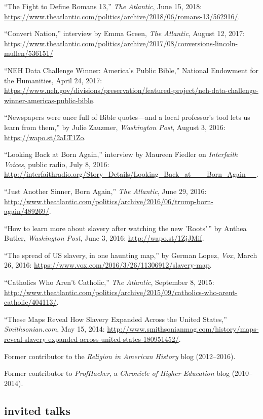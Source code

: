 \documentclass[11pt]{article}
\begin{document}
``The Fight to Define Romans 13,'' \emph{The Atlantic}, June 15, 2018: \url{https://www.theatlantic.com/politics/archive/2018/06/romans-13/562916/}.

``Convert Nation,'' interview by Emma Green, \emph{The Atlantic}, August 12, 
2017: \url{https://www.theatlantic.com/politics/archive/2017/08/conversions-lincoln-mullen/536151/}

``NEH Data Challenge Winner: America's Public Bible,'' National Endowment for 
the Humanities, April 24, 2017: 
\url{https://www.neh.gov/divisions/preservation/featured-project/neh-data-challenge-winner-americas-public-bible}.

``Newspapers were once full of Bible quotes---and a local professor's tool lets 
us learn from them,'' by Julie Zauzmer, \emph{Washington Post}, August 3, 2016: 
\url{https://wapo.st/2aLT1Zo}.

``Looking Back at Born Again,'' interview by Maureen Fiedler on \emph{Interfaith Voices}, public 
radio, July 8, 2016:  
\url{http://interfaithradio.org/Story_Details/Looking_Back_at___Born_Again__}.

``Just Another Sinner, Born Again,'' \emph{The Atlantic}, June 29, 2016: 
\url{http://www.theatlantic.com/politics/archive/2016/06/trump-born-again/489269/}.

``How to learn more about slavery after watching the new 'Roots'\,'' by Anthea Butler, \emph{Washington Post}, June 3, 2016: \url{http://wapo.st/1ZjJMif}.

``The spread of US slavery, in one haunting map,'' by German Lopez, 
\emph{Vox}, March 26, 2016: 
\url{https://www.vox.com/2016/3/26/11306912/slavery-map}.

``Catholics Who Aren't Catholic,'' \emph{The Atlantic}, September 8, 
2015:  
\url{http://www.theatlantic.com/politics/archive/2015/09/catholics-who-arent-catholic/404113/}.

``These Maps Reveal How Slavery Expanded Across the United States,''
\emph{Smithsonian.com}, May 15, 2014:
\url{http://www.smithsonianmag.com/history/maps-reveal-slavery-expanded-across-united-states-180951452/}.

Former contributor to the \emph{Religion in American History} blog (2012--2016).

Former contributor to \emph{ProfHacker}, a \emph{Chronicle of Higher 
  Education} blog (2010--2014). 

\subsection{invited talks}\label{invited-talks}
\end{document}
